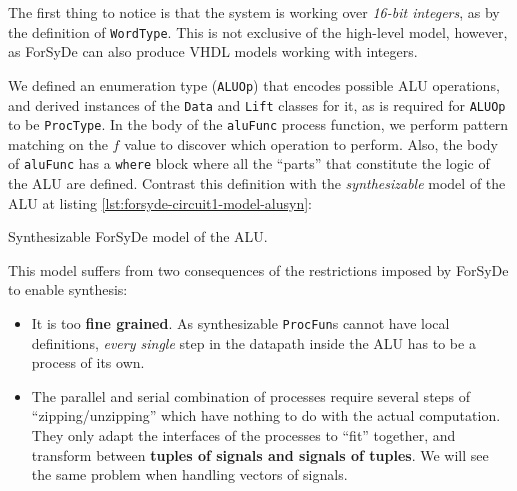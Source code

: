 \documentclass[a4paper]{article}
\begin{document}
                The first thing to notice is that the system is working over \emph{16-bit integers},
                as by the definition of \texttt{WordType}. This is not exclusive of the high-level
                model, however, as ForSyDe can also produce VHDL models working with integers.

                We defined an enumeration type (\texttt{ALUOp}) that encodes possible ALU
                operations, and derived instances of the \texttt{Data} and \texttt{Lift} classes for
                it, as is required for \texttt{ALUOp} to be \texttt{ProcType}. In the body of the
                \texttt{aluFunc} process function, we perform pattern matching on the $f$ value to
                discover which operation to perform. Also, the body of \texttt{aluFunc} has a
                \texttt{where} block where all the ``parts'' that constitute the logic of the ALU
                are defined. Contrast this definition with the \emph{synthesizable} model of the
                ALU at listing \ref{lst:forsyde-circuit1-model-alusyn}:

                \begin{listing}[h!]
                    \caption{Synthesizable ForSyDe model of the ALU.
                        \label{lst:forsyde-circuit1-model-alusyn}}
                \end{listing}

                This model suffers from two consequences of the restrictions imposed by ForSyDe to
                enable synthesis:

                \begin{itemize}
                    \item It is too \textbf{fine grained}. As synthesizable \texttt{ProcFun}s cannot
                        have local definitions, \emph{every single} step in the datapath inside the
                        ALU has to be a process of its own.

                    \item The parallel and serial combination of processes require several steps of
                        ``zipping/unzipping'' which have nothing to do with the actual computation.
                        They only adapt the interfaces of the processes to ``fit'' together, and
                        transform between \textbf{tuples of signals and signals of tuples}. We will
                        see the same problem when handling vectors of signals.
                \end{itemize}
\end{document}
